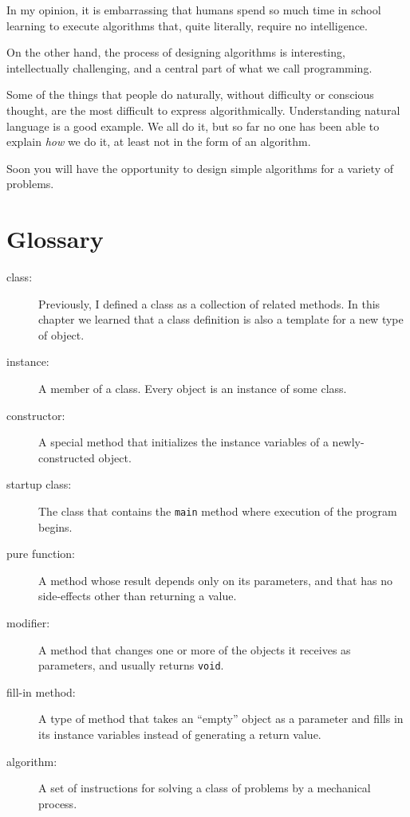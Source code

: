 \documentclass[12pt]{book}
\theoremstyle{definition}
\begin{document}
In my opinion, it is embarrassing that humans spend so much
time in school learning to execute algorithms that,
quite literally, require no intelligence.

On the other hand, the process of designing algorithms is
interesting, intellectually challenging, and a central part
of what we call programming.

Some of the things that people do naturally, without difficulty
or conscious thought, are the most difficult to express
algorithmically.  Understanding natural language is a good
example.  We all do it, but so far no one has been able to
explain {\em how} we do it, at least not in the form of an
algorithm.

Soon you will have the opportunity to design
simple algorithms for a variety of problems.


\section{Glossary}

\begin{description}

\item[class:]  Previously, I defined a class as a collection
of related methods.  In this chapter we learned that a class
definition is also a template for a new type of object.

\item[instance:]  A member of a class.  Every object is an
instance of some class.

\item[constructor:]  A special method that initializes the instance
variables of a newly-constructed object.

\item[startup class:]  The class that contains the {\tt main}
method where execution of the program begins.

\item[pure function:]  A method whose result depends only on its
parameters, and that has no side-effects other than returning
a value.

\item[modifier:]  A method that changes one or more of the objects
it receives as parameters, and usually returns {\tt void}.

\item[fill-in method:]  A type of method that takes an ``empty''
object as a parameter and fills in its instance variables instead
of generating a return value.

\item[algorithm:]  A set of instructions for solving a class of
problems by a mechanical process.


\end{description}
\end{document}
